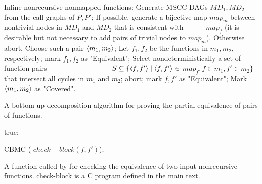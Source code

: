 \begin{algorithm}
\begin{algorithmic}[1]
\State \label{step:inline} Inline nonrecursive nonmapped functions;
\State \label{step:generate} Generate MSCC DAGs $MD_1, MD_2$
          from the call graphs of $P,P'$;
\State If possible,\label{step:possible} generate a bijective map $map_m$ between nontrivial nodes in $MD_1$ and $MD_2$ that is consistent with 
\mbox{~~~~~} $map_f$ (it is desirable but not necessary to add pairs of trivial nodes to $map_m$). Otherwise abort.
 \label{step:while}
  \State \label{step:choose} Choose such a pair $\langle m_1,m_2\rangle$;
   \label{step:m1}
    \State Let $f_1,f_2$ be the functions in $m_1,m_2$, respectively;
     \label{step:Check}
          {mark $f_1,f_2$ as "Equivalent"; }
    \EndIf \label{step:m1endIf}
    \Else
      \State \label{step:select}Select nondeterministically a set of function pairs \newline \mbox{~~~~~~~~~~~~~~~~~} $S \subseteq \{\langle f,f'\rangle\mid \langle f,f'\rangle \in$ $map_f, f \in m_1, f' \in m_2\}$ that intersect all cycles in $m_1$ and $m_2$;
      \label{step:forall}
        \label{step:abort}{abort;} 
        \EndIf
      \EndFor
       \label{step:forall2}
         mark $f,f'$ as "Equivalent";
      \EndFor
  \EndIf \label{step:selectEnd}
\State \label{step:mark} Mark $\langle m_1,m_2\rangle$ as "Covered".
\EndWhile
\EndFunction
\end{algorithmic}
\caption{A bottom-up decomposition algorithm for proving the partial equivalence of pairs of functions.}
\label{alg:OriginalProve}
\end{algorithm}


\begin{algorithm}
\begin{algorithmic}[1]


 true;

\EndIf

 CBMC ( $check-block (f,f')$);

\EndFunction
\end{algorithmic}
\caption{A function called by  for checking the equivalence of two
input nonrecursive functions. check-block is a C program defined in the main text.}
\label{alg:Check}
\end{algorithm}

